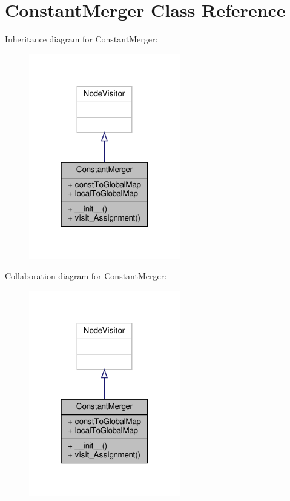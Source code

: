 \hypertarget{classVisitors_1_1ConstantMerger}{}\section{Constant\+Merger Class Reference}
\label{classVisitors_1_1ConstantMerger}


Inheritance diagram for Constant\+Merger\+:\nopagebreak
\begin{figure}[H]
\begin{center}
\leavevmode
\includegraphics[width=187pt]{classVisitors_1_1ConstantMerger__inherit__graph}
\end{center}
\end{figure}


Collaboration diagram for Constant\+Merger\+:\nopagebreak
\begin{figure}[H]
\begin{center}
\leavevmode
\includegraphics[width=187pt]{classVisitors_1_1ConstantMerger__coll__graph}
\end{center}
\end{figure}
